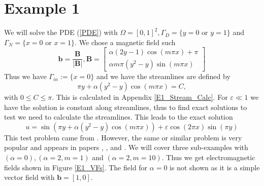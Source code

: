 \documentclass[12pt]{ociamthesis}
\begin{document}
\section{Example 1}
We will solve the PDE (\ref{PDE}) with $\Omega = [0,1]^2, \Gamma_D = \{y=0 \text{ or } y=1\}$ and $\Gamma_N = \{x=0 \text{ or } x=1\}$. We chose a magnetic field such
\begin{equation} \label{E1_b}
\mathbf{b} = \frac{\mathbf{B}}{|\mathbf{B}|}, 
\mathbf{B} = \left[ \begin{matrix}
\alpha(2y-1)\cos(m\pi x) + \pi\\
\alpha m \pi (y^2-y)\sin(m \pi x)
\end{matrix} \right]
\end{equation}
Thus we have $\Gamma_{in} := \{x=0\}$ and we have the streamlines are defined by 
\begin{equation}
\pi y + \alpha (y^2-y) \cos(m\pi x) = C,
\end{equation}
with $0 \leq C \leq \pi$. This is calculated in Appendix \ref{E1_Stream_Calc}. For $\varepsilon \ll 1$ we have the solution is constant along streamlines, thus to find exact solutions to test we need to calculate the streamlines. This leads to the exact solution 
\begin{equation} \label{E1_u}
u = \sin(\pi y + \alpha (y^2-y) \cos(m\pi x)) + \varepsilon \cos(2 \pi x) \sin(\pi y)
\end{equation}
This test problem came from \cite{DN}. However, the same or similar problem is very popular and appears in papers \cite{LINE_INT}, \cite{AP}, \cite{MMAP} and \cite{STAB}. We will cover three sub-examples with $(\alpha=0),(\alpha=2,m=1)$ and $(\alpha = 2, m=10)$. Thus we get electromagnetic fields shown in Figure \ref{E1_VFs}. The field for $\alpha = 0$ is not shown as it is a simple vector field with $\mathbf{b}= [1, 0]$.
\end{document}

